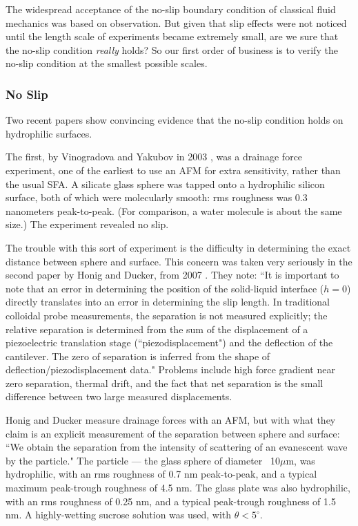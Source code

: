 \documentclass[12pt, a4paper, twoside, openright]{book}
\begin{document}
The widespread acceptance of the no-slip boundary condition of classical fluid mechanics was based on observation. But given that slip effects were not noticed until the length scale of experiments became extremely small, are we sure that the no-slip condition \emph{really} holds?  So our first order of business is to verify the no-slip condition at the smallest possible scales.

\subsubsection{No Slip}

Two recent papers show convincing evidence that the no-slip condition holds on hydrophilic surfaces.

The first, by Vinogradova and Yakubov in 2003 \cite{VinogradovaYakubov2003}, was a drainage force experiment, one of the earliest to use an AFM for extra sensitivity, rather than the usual SFA. A silicate glass sphere was tapped onto a hydrophilic silicon surface, both of which were molecularly smooth: rms roughness was 0.3 nanometers peak-to-peak. (For comparison, a water molecule is about the same size.) The experiment revealed no slip.

The trouble with this sort of experiment is the difficulty in determining the exact distance between sphere and surface.  This concern was taken very seriously in the second paper by Honig and Ducker, from 2007 \cite{HonigDucker2007}. They note: ``It is important to note that an error in determining the position of the solid-liquid interface ($h=0$) directly translates into an error in determining the slip length. In traditional colloidal probe measurements, the separation is not measured explicitly; the relative separation is determined from the sum of the displacement of a piezoelectric translation stage (``piezodisplacement") and the deflection of the cantilever. The zero of separation is inferred from the shape of deflection/piezodisplacement data." Problems include high force gradient near zero separation, thermal drift, and the fact that net separation is the small difference between two large measured displacements.

Honig and Ducker measure drainage forces with an AFM, but with what they claim is an explicit measurement of the separation between sphere and surface: ``We obtain the separation from the intensity of scattering of an evanescent wave by the particle." The particle --- the glass sphere of diameter ~10$\mu$m, was hydrophilic, with an rms roughness of 0.7 nm peak-to-peak, and a typical maximum peak-trough roughness of 4.5 nm. The glass plate was also hydrophilic, with an rms roughness of 0.25 nm, and a typical peak-trough roughness of 1.5 nm. A highly-wetting sucrose solution was used, with $\theta<5^{\circ}$.
\end{document}
